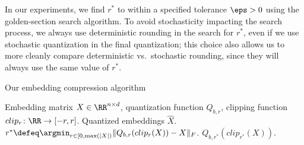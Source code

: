 In our experiments, we find $r^*$ to within a specified tolerance $\eps > 0$ using the golden-section search algorithm.
To avoid stochasticity impacting the search process, we always use deterministic rounding in the search for $r^*$, even if we use stochastic quantization in the final quantization;
this choice also allows us to more cleanly compare deterministic vs.\ stochastic rounding, since they will always use the same value of $r^*$.

\begin{algorithm}[tb]
   \caption{Our embedding compression algorithm}
   \label{alg:smallfry}
\begin{algorithmic}[1]
	  Embedding matrix $X \in \RR^{n \times d}$, quantization function $Q_{b,r}$, clipping function $clip_r\colon\RR\rightarrow[-r,r]$.
	 Quantized embeddings $\hat{X}$.
	\STATE $r^* \defeq \argmin_{r \in [0,\max(|X|)} \|Q_{b,r}(clip_r(X))-X\|_F$.
	 $Q_{b,r^*}(clip_{r^*}(X))$.
\end{algorithmic}
\end{algorithm}

